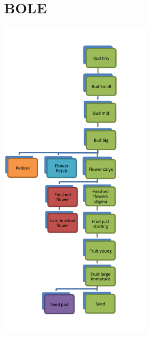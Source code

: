 \documentclass[10pt]{book} %
\begin{document}
\section{BOLE}
\begin{multicols}{2}
\includegraphics[width=3in]{BOLE.png}
\vfill
\columnbreak

\end{multicols}


\clearpage
\newpage
\end{document}
